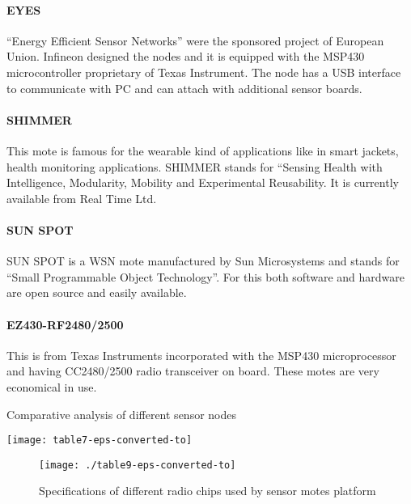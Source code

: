 \documentclass[12pt,journal,communications surveys and tutorials]{IEEEtran}
\begin{document}
\paragraph{EYES}
“Energy Efficient Sensor Networks” were the sponsored project of European Union. Infineon designed the nodes and it is equipped with the MSP430 microcontroller proprietary of Texas Instrument. The node has a USB interface to communicate with PC and can attach with additional sensor boards.
\paragraph{SHIMMER}
This mote is famous for the wearable kind of applications like in smart jackets, health monitoring applications. SHIMMER stands for “Sensing Health with Intelligence, Modularity, Mobility and Experimental Reusability. It is currently available from Real Time Ltd.
\paragraph{SUN SPOT}
SUN SPOT is a WSN mote manufactured by Sun Microsystems and stands for “Small Programmable Object Technology”. For this both software and hardware are open source and easily available.
\paragraph{EZ430-RF2480/2500}
This is from Texas Instruments incorporated with the MSP430 microprocessor and having CC2480/2500 radio transceiver on board. These motes are very economical in use.
\begin{table}\caption{Comparative analysis of different sensor nodes\label{tab:four}}
 {\texttt{[image: table7-eps-converted-to]}}
 \end{table}
 \begin{figure*}[t]
\centering
\texttt{[image: ./table9-eps-converted-to]}
\caption{Specifications of different radio chips used by sensor motes platform}
\label{fig:table9-eps-converted-to}
\end{figure*}
\end{document}
